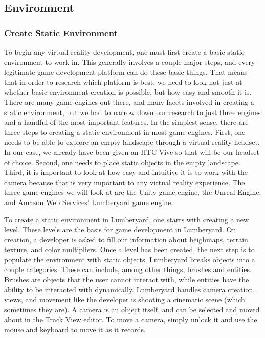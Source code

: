 \documentclass[10pt,journal,compsoc,onecolumn, draftclsnofoot]{IEEEtran}
\begin{document}
\subsection{Environment}
\subsubsection{Create Static Environment}

To begin any virtual reality development, one must first create a basic static environment to work in. This generally involves a couple major steps, and every legitimate game development platform can do these basic things.
That means that in order to research which platform is best, we need to look not just at whether basic environment creation is possible, but how easy and smooth it is.
There are many game engines out there, and many facets involved in creating a static environment, but we had to narrow down our research to just three engines and a handful of the most important features.
In the simplest sense, there are three steps to creating a static environment in most game engines.
First, one needs to be able to explore an empty landscape through a virtual reality headset.
In our case, we already have been given an HTC Vive so that will be our headset of choice.
Second, one needs to place static objects in the empty landscape.
Third, it is important to look at how easy and intuitive it is to work with the camera because that is very important to any virtual reality experience.
The three game engines we will look at are the Unity game engine, the Unreal Engine, and Amazon Web Services' Lumberyard game engine.

To create a static environment in Lumberyard, one starts with creating a new level.  These levels are the basis for game development in Lumberyard. \cite{lumberyard_levels_environment}
On creation, a developer is asked to fill out information about heighmaps, terrain texture, and color multipliers.
Once a level has been created, the next step is to populate the environment with static objects.
Lumberyard breaks objects into a couple categories.  These can include, among other things, brushes and entities.
Brushes are objects that the user cannot interact with, while entities have the ability to be interacted with dynamically. \cite{lumberyard_object_system}
Lumberyard handles camera creation, views, and movement like the developer is shooting a cinematic scene (which sometimes they are).
A camera is an object itself, and can be selected and moved about in the Track View editor.  To move a camera, simply unlock it and use the mouse and keyboard to move it as it records. \cite{lumberyard_object_system}
\end{document}
